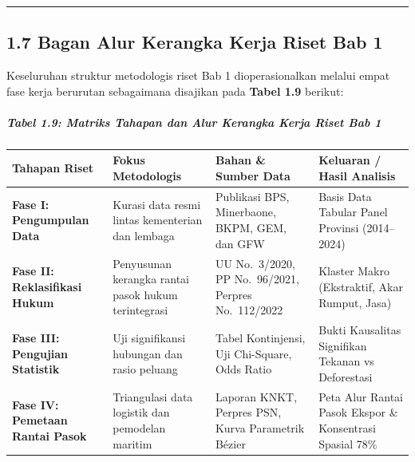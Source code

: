 \documentclass[
]{article}
\newcounter{none} %
\begin{document}
\begin{center}\rule{0.5\linewidth}{0.5pt}\end{center}

\subsection{1.7 Bagan Alur Kerangka Kerja Riset Bab
1}\label{bagan-alur-kerangka-kerja-riset-bab-1}

Keseluruhan struktur metodologis riset Bab 1 dioperasionalkan melalui
empat fase kerja berurutan sebagaimana disajikan pada \textbf{Tabel 1.9}
berikut:

\subparagraph{Tabel 1.9: Matriks Tahapan dan Alur Kerangka Kerja Riset
Bab
1}\label{tabel-1.9-matriks-tahapan-dan-alur-kerangka-kerja-riset-bab-1}

{\def\LTcaptype{none} %
\begin{longtable}[]{@{}
  >{\raggedright\arraybackslash}p{}
  >{\raggedright\arraybackslash}p{}
  >{\raggedright\arraybackslash}p{}
  >{\raggedright\arraybackslash}p{}@{}}
\toprule\noalign{}
\begin{minipage}[b]{\linewidth}\raggedright
Tahapan Riset
\end{minipage} & \begin{minipage}[b]{\linewidth}\raggedright
Fokus Metodologis
\end{minipage} & \begin{minipage}[b]{\linewidth}\raggedright
Bahan \& Sumber Data
\end{minipage} & \begin{minipage}[b]{\linewidth}\raggedright
Keluaran / Hasil Analisis
\end{minipage} \\
\midrule\noalign{}
\endhead
\bottomrule\noalign{}
\endlastfoot
\textbf{Fase I: Pengumpulan Data} & Kurasi data resmi lintas kementerian
dan lembaga & Publikasi BPS, Minerbaone, BKPM, GEM, dan GFW & Basis Data
Tabular Panel Provinsi (2014--2024) \\
\textbf{Fase II: Reklasifikasi Hukum} & Penyusunan kerangka rantai pasok
hukum terintegrasi & UU No.~3/2020, PP No.~96/2021, Perpres No.~112/2022
& 3 Klaster Makro (Ekstraktif, Akar Rumput, Jasa) \\
\textbf{Fase III: Pengujian Statistik} & Uji signifikansi hubungan dan
rasio peluang & Tabel Kontinjensi, Uji Chi-Square, Odds Ratio & Bukti
Kausalitas Signifikan Tekanan vs Deforestasi \\
\textbf{Fase IV: Pemetaan Rantai Pasok} & Triangulasi data logistik dan
pemodelan maritim & Laporan KNKT, Perpres PSN, Kurva Parametrik Bézier &
Peta Alur Rantai Pasok Ekspor \& Konsentrasi Spasial 78\% \\
\end{longtable}
}
\end{document}
